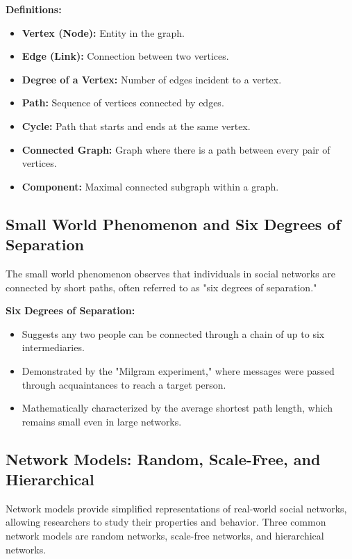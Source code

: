 \documentclass[12pt]{book} %
\begin{document}
\textbf{Definitions:}
\begin{itemize}
    \item \textbf{Vertex (Node):} Entity in the graph.
    \item \textbf{Edge (Link):} Connection between two vertices.
    \item \textbf{Degree of a Vertex:} Number of edges incident to a vertex.
    \item \textbf{Path:} Sequence of vertices connected by edges.
    \item \textbf{Cycle:} Path that starts and ends at the same vertex.
    \item \textbf{Connected Graph:} Graph where there is a path between every pair of vertices.
    \item \textbf{Component:} Maximal connected subgraph within a graph.
\end{itemize}

\subsection{Small World Phenomenon and Six Degrees of Separation}

The small world phenomenon observes that individuals in social networks are connected by short paths, often referred to as "six degrees of separation."

\textbf{Six Degrees of Separation:}
\begin{itemize}
    \item Suggests any two people can be connected through a chain of up to six intermediaries.
    \item Demonstrated by the "Milgram experiment," where messages were passed through acquaintances to reach a target person.
    \item Mathematically characterized by the average shortest path length, which remains small even in large networks.
\end{itemize}


\subsection{Network Models: Random, Scale-Free, and Hierarchical}

Network models provide simplified representations of real-world social networks, allowing researchers to study their properties and behavior. Three common network models are random networks, scale-free networks, and hierarchical networks.
\end{document}
